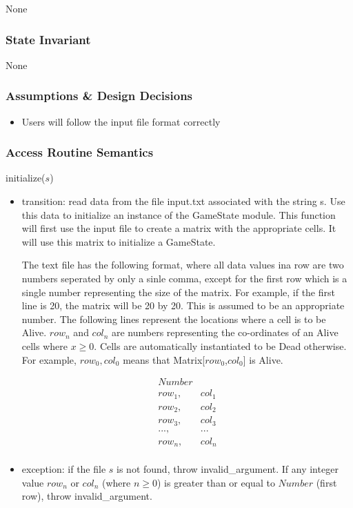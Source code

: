\documentclass[12pt]{article}
\begin{document}
None

\subsubsection* {State Invariant}

None

\subsubsection* {Assumptions \& Design Decisions}

\begin{itemize}
\item Users will follow the input file format correctly

\end{itemize}

\subsubsection* {Access Routine Semantics}

\noindent initialize($s$)
\begin{itemize}
\item transition: read data from the file input.txt associated with the string s.
  Use this data to initialize an instance of the GameState module. This function will
  first use the input file to create a matrix with the appropriate cells. It will use this
  matrix to initialize a GameState.

  The text file has the following format, where all data values ina row are two numbers
  seperated by only a sinle comma, except for the first row which is a single number representing the
  size of the matrix. For example, if the first line is 20, the matrix will be 20 by 20.
   This is assumed to be an appropriate number. The following lines represent
  the locations where a cell is to be Alive. $row_n$ and $col_n$ are numbers representing
  the co-ordinates of an Alive cells where $x \geq 0$. Cells are automatically instantiated to be Dead
  otherwise. For example, $row_0, col_0$ means that Matrix[$row_0$,$col_0$] is Alive.

  \begin{equation}
    \begin{array}{ccccccc}
      Number\\
      row_1, & col_1\\
      row_2, & col_2\\
      row_3, & col_3
      \\
      ..., & ...
      \\
      row_n, & col_n \\
    \end{array}
  \end{equation}

\item exception: if the file $s$ is not found, throw invalid\_argument. If any integer value
  $row_n$ or $col_n$ (where $n \geq 0$) is greater than or equal to $Number$ (first row), throw invalid\_argument.
\end{itemize}
\end{document}
